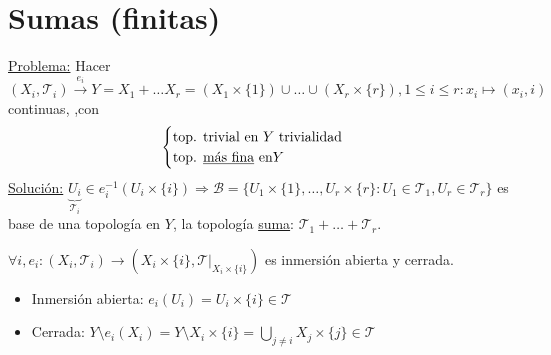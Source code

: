 \section{Sumas (finitas)}%
\label{sec:sumas_finitas_}
\underline{Problema:} Hacer $\left( X_i, \mathcal{T}_i \right) \xrightarrow{e_i} Y = X_1 + \ldots X_r = \left( X_1 \times \{1\} \right) \cup \ldots \cup \left( X_r \times \{r\} \right), 1 \le i \le r: x_i \mapsto \left( x_i, i \right)$ continuas, ,con 
\[
\begin{cases}
    \text{top. trivial en } Y \text{ trivialidad}\\
    \text{top. \underline{más fina} en} Y
\end{cases} 
\]
\underline{Solución:} $\underbrace{U_i}_{\mathcal{T}_i} \in e_i^{-1}\left( U_i \times \{i\} \right) \Rightarrow \mathcal{B} = \{U_1 \times \{1\}, \ldots, U_r \times \{r\}: U_1 \in \mathcal{T}_1, U_r \in \mathcal{T}_r\}$ es base de una topología en $Y$, la topología \underline{suma}: $\mathcal{T}_1 + \ldots + \mathcal{T}_r$.

\begin{prop}
$\forall i, e_i: \left( X_i, \mathcal{T}_i \right) \rightarrow \left( X_i\times \{i\}, \mathcal{T}|_{X_i \times \{i\}} \right)$ es inmersión abierta y cerrada.
\end{prop}
\begin{demo}
\begin{itemize}
    \item Inmersión abierta: $e_i\left( U_i \right) = U_i \times \{i\} \in \mathcal{T}$
    \item Cerrada: $Y\setminus e_i\left( X_i \right) = Y \setminus X_i \times \{i\} = \bigcup_{j \neq i} X_j \times \{j\} \in \mathcal{T}$
\end{itemize}
\end{demo}

